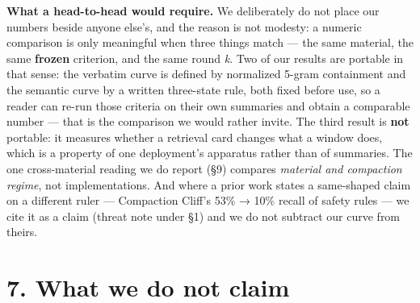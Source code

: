 \documentclass[
]{article}
\begin{document}
\textbf{What a head-to-head would require.} We deliberately do not place
our numbers beside anyone else's, and the reason is not modesty: a
numeric comparison is only meaningful when three things match --- the
same material, the same \textbf{frozen} criterion, and the same round
\emph{k}. Two of our results are portable in that sense: the verbatim
curve is defined by normalized 5-gram containment and the semantic curve
by a written three-state rule, both fixed before use, so a reader can
re-run those criteria on their own summaries and obtain a comparable
number --- that is the comparison we would rather invite. The third
result is \textbf{not} portable: it measures whether a retrieval card
changes what a window does, which is a property of one deployment's
apparatus rather than of summaries. The one cross-material reading we do
report (§9) compares \emph{material and compaction regime}, not
implementations. And where a prior work states a same-shaped claim on a
different ruler --- Compaction Cliff's 53\% → 10\% recall of safety
rules --- we cite it as a claim (threat note under §1) and we do not
subtract our curve from theirs.

\section{7. What we do not claim}\label{what-we-do-not-claim}
\end{document}
